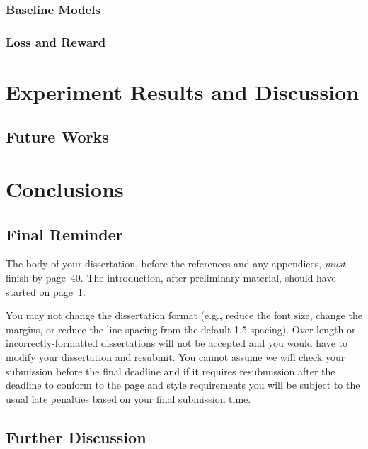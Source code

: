 \documentclass[msc,deptreport]{infthesis} %
\begin{document}
\subsection{Baseline Models}
\label{ssec3.2.3:baselines}

\subsection{Loss and Reward}
\label{ssec3.2.4:loss_reward}


\chapter{Experiment Results and Discussion}
\label{ch4:results_analysis}

\section{Future Works}
\label{sec4.2:future_work}


\chapter{Conclusions}
\label{ch5:conclusion}

\section{Final Reminder}

The body of your dissertation, before the references and any appendices,
\emph{must} finish by page~40. The introduction, after preliminary material,
should have started on page~1.

You may not change the dissertation format (e.g., reduce the font
size, change the margins, or reduce the line spacing from the default
1.5 spacing). Over length or incorrectly-formatted dissertations will
not be accepted and you would have to modify your dissertation and
resubmit.  You cannot assume we will check your submission before the
final deadline and if it requires resubmission after the deadline to
conform to the page and style requirements you will be subject to the
usual late penalties based on your final submission time.

\section{Further Discussion}
\label{sec5.1:discusstion}
\end{document}
